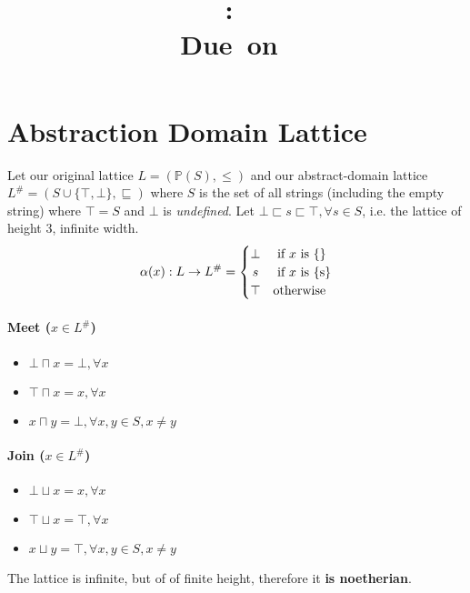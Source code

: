 \documentclass{article}
\title{
\vspace{2in}
\textmd{\textbf{\hmwkClass:\ \hmwkTitle}}\\
\normalsize\vspace{0.1in}\small{Due\ on\ \hmwkDueDate}\\
\vspace{0.1in}\large{\textit{\hmwkClassInstructor}}
\vspace{3in}
}
\author{\textbf{\hmwkAuthorName}}
\date{} %
\newcommand{\powerset}[1]{\mathbb{P}(#1)}
\begin{document}
\maketitle
\newpage



\section{Abstraction Domain Lattice}
Let our original lattice $L = (\powerset{S}, \leq)$ and our abstract-domain lattice $L^\# = (S \cup \{ \top,\bot \},\sqsubseteq)$ where $S$ is the set of all strings (including the empty string) where $\top = S$ and $\bot$ is \emph{undefined}. Let $\bot \sqsubset s \sqsubset \top, \forall s \in S$, i.e. the lattice of height 3, infinite width. 
\[
 \alpha(x): L \rightarrow L^\# =
  \begin{cases} 
      \hfill \bot    \hfill & \text{ if $x$ is \{\}} \\
      \hfill s \hfill & \text{ if $x$ is \{s\}} \\
      \hfill \top \hfill & \text{otherwise}
  \end{cases}
\]

\paragraph{Meet ($x \in L^\#$)}
\begin{itemize}
	\item $\bot \sqcap x = \bot, \forall x$
	\item $\top \sqcap x = x, \forall x$
	\item $x \sqcap y = \bot, \forall x,y \in S, x \neq y$
\end{itemize}
\paragraph{Join ($x \in L^\#$)}
\begin{itemize}
	\item $\bot \sqcup x = x, \forall x$
	\item $\top \sqcup x = \top, \forall x$
	\item $x \sqcup y = \top, \forall x,y \in S, x \neq y$
\end{itemize}

The lattice is infinite, but of of finite height, therefore it \textbf{is noetherian}.
\end{document}
